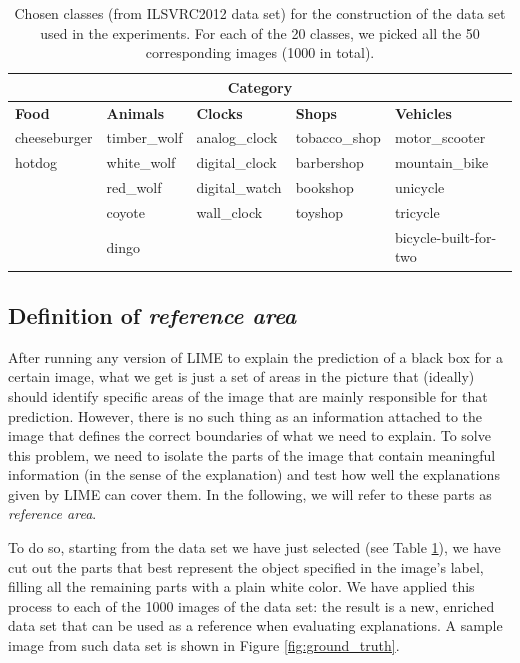 \documentclass[12pt, twoside, a4paper]{report}
\begin{document}
\begin{table}[]
\def\arraystretch{1.2}
\begin{tabularx}{\textwidth}{|XXXXp{2.5cm}|}
\hline
\multicolumn{5}{|c|}{\textbf{Category}} \\ \hline

\textbf{Food} & 
\textbf{Animals} & 
\textbf{Clocks} & 
\textbf{Shops} & 
\textbf{Vehicles} \\ \hline

cheeseburger & timber\_wolf & analog\_clock & tobacco\_shop & motor\_scooter \\
hotdog & white\_wolf & digital\_clock & barbershop & mountain\_bike \\
 & red\_wolf & digital\_watch & bookshop & unicycle \\
 & coyote & wall\_clock & toyshop & tricycle \\
 & dingo &  &  & bicycle-built-for-two \\ \hline
\end{tabularx}
\caption{Chosen classes (from ILSVRC2012 data set) for the construction of the data set used in the experiments. For each of the 20 classes, we picked all the 50 corresponding images (1000 in total).}
\label{tab:chosen_classes}
\end{table}

\subsection{Definition of \textit{reference area}}

After running any version of LIME to explain the prediction of a black box for a certain image, what we get is just a set of areas in the picture that (ideally) should identify specific areas of the image that are mainly responsible for that prediction. However, there is no such thing as an information attached to the image that defines the correct boundaries of what we need to explain. To solve this problem, we need to isolate the parts of the image that contain meaningful information (in the sense of the explanation) and test how well the explanations given by LIME can cover them. In the following, we will refer to these parts as \textit{reference area}. 

To do so, starting from the data set we have just selected (see Table \ref{tab:chosen_classes}), we have cut out the parts that best represent the object specified in the image's label, filling all the remaining parts with a plain white color. We have applied this process to each of the 1000 images of the data set: the result is a new, enriched data set that can be used as a reference when evaluating explanations. A sample image from such data set is shown in Figure \ref{fig:ground_truth}.
\end{document}
